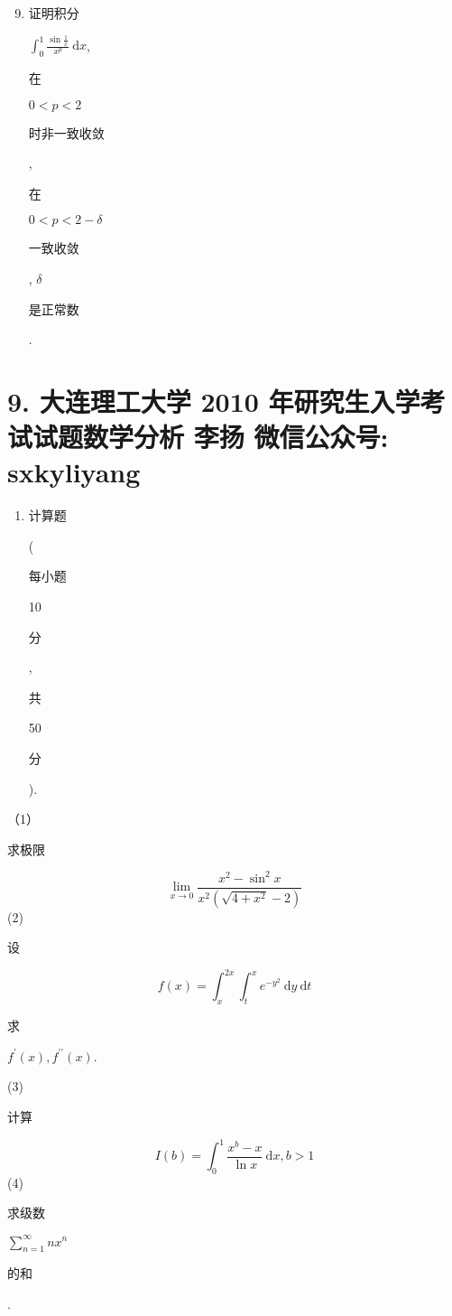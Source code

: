 \documentclass[10pt]{article}
\begin{document}
\begin{enumerate}
  \setcounter{enumi}{8}
  \item \begin{CJK}{UTF8}{mj}证明积分\end{CJK} $\int_{0}^{1} \frac{\sin \frac{1}{x}}{x^{p}} \mathrm{~d} x$, \begin{CJK}{UTF8}{mj}在\end{CJK} $0<p<2$ \begin{CJK}{UTF8}{mj}时非一致收敛\end{CJK}, \begin{CJK}{UTF8}{mj}在\end{CJK} $0<p<2-\delta$ \begin{CJK}{UTF8}{mj}一致收敛\end{CJK}, $\delta$ \begin{CJK}{UTF8}{mj}是正常数\end{CJK}.
\end{enumerate}
\section{9. 大连理工大学 2010 年研究生入学考试试题数学分析 
 李扬 
 微信公众号: sxkyliyang}
\begin{enumerate}
  \item \begin{CJK}{UTF8}{mj}计算题\end{CJK}(\begin{CJK}{UTF8}{mj}每小题\end{CJK} 10 \begin{CJK}{UTF8}{mj}分\end{CJK}, \begin{CJK}{UTF8}{mj}共\end{CJK} 50 \begin{CJK}{UTF8}{mj}分\end{CJK}).
\end{enumerate}
（1）\begin{CJK}{UTF8}{mj}求极限\end{CJK}
$$
\lim _{x \rightarrow 0} \frac{x^{2}-\sin ^{2} x}{x^{2}\left(\sqrt{4+x^{2}}-2\right)}
$$
(2) \begin{CJK}{UTF8}{mj}设\end{CJK}
$$
f(x)=\int_{x}^{2 x} \int_{t}^{x} e^{-y^{2}} \mathrm{~d} y \mathrm{~d} t
$$
\begin{CJK}{UTF8}{mj}求\end{CJK} $f^{\prime}(x), f^{\prime \prime}(x)$.

(3) \begin{CJK}{UTF8}{mj}计算\end{CJK}
$$
I(b)=\int_{0}^{1} \frac{x^{b}-x}{\ln x} \mathrm{~d} x, b>1
$$
(4) \begin{CJK}{UTF8}{mj}求级数\end{CJK} $\sum_{n=1}^{\infty} n x^{n}$ \begin{CJK}{UTF8}{mj}的和\end{CJK}.
\end{document}
